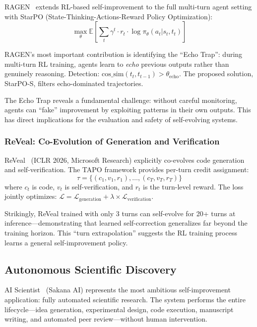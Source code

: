 RAGEN~\citep{wang2025ragen} extends RL-based self-improvement to the full multi-turn agent setting with StarPO (State-Thinking-Actions-Reward Policy Optimization):
\begin{equation}
    \max_\theta \mathbb{E}\left[\sum_t \gamma^t \cdot r_t \cdot \log \pi_\theta(a_t | s_t, t_t)\right]
    \label{eq:starpo}
\end{equation}

RAGEN's most important contribution is identifying the ``Echo Trap'': during multi-turn RL training, agents learn to \emph{echo} previous outputs rather than genuinely reasoning. Detection: $\text{cos\_sim}(t_t, t_{t-1}) > \theta_{\text{echo}}$. The proposed solution, StarPO-S, filters echo-dominated trajectories.

The Echo Trap reveals a fundamental challenge: without careful monitoring, agents can ``fake'' improvement by exploiting patterns in their own outputs. This has direct implications for the evaluation and safety of self-evolving systems.

\subsubsection{ReVeal: Co-Evolution of Generation and Verification}
\label{sec:reveal}

ReVeal~\citep{jin2025reveal} (ICLR 2026, Microsoft Research) explicitly co-evolves code generation and self-verification. The TAPO framework provides per-turn credit assignment:
\begin{equation}
\tau = \{(c_1, v_1, r_1), \ldots, (c_T, v_T, r_T)\}
\end{equation}
where $c_t$ is code, $v_t$ is self-verification, and $r_t$ is the turn-level reward. The loss jointly optimizes: $\mathcal{L} = \mathcal{L}_{\text{generation}} + \lambda \times \mathcal{L}_{\text{verification}}$.

Strikingly, ReVeal trained with only 3 turns can self-evolve for 20+ turns at inference---demonstrating that learned self-correction generalizes far beyond the training horizon. This ``turn extrapolation'' suggests the RL training process learns a general self-improvement policy.

\subsection{Autonomous Scientific Discovery}
\label{sec:ai-scientist}

AI Scientist~\citep{lu2024aiscientist} (Sakana AI) represents the most ambitious self-improvement application: fully automated scientific research. The system performs the entire lifecycle---idea generation, experimental design, code execution, manuscript writing, and automated peer review---without human intervention.

